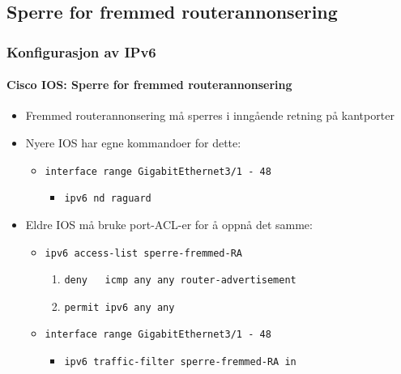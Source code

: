 \subsection{Sperre for fremmed routerannonsering}
\begin{frame}
  \frametitle{Konfigurasjon av IPv6}
  \framesubtitle{Cisco IOS: Sperre for fremmed routerannonsering}
  \begin{itemize}
  \item Fremmed routerannonsering må sperres i \alert{inngående} retning på
    \alert{kantporter}
  \item Nyere IOS har egne kommandoer for dette:
    \begin{itemize}
    \item \texttt{interface range GigabitEthernet3/1 - 48}
      \begin{itemize}[<+->]
      \item \texttt{ipv6 nd raguard}
      \end{itemize}
    \end{itemize}
  \item Eldre IOS må bruke port-ACL-er for å oppnå det samme:
    \begin{itemize}
    \item \texttt{ipv6 access-list sperre-fremmed-RA}
      \begin{enumerate}
      \item \texttt{deny\ \ \ icmp any any router-advertisement}
      \item \texttt{permit    ipv6 any any}
      \end{enumerate}
    \item \texttt{interface range GigabitEthernet3/1 - 48}
      \begin{itemize}
      \item \texttt{ipv6 traffic-filter sperre-fremmed-RA in}
      \end{itemize}
    \end{itemize}
  \end{itemize}
\end{frame}

